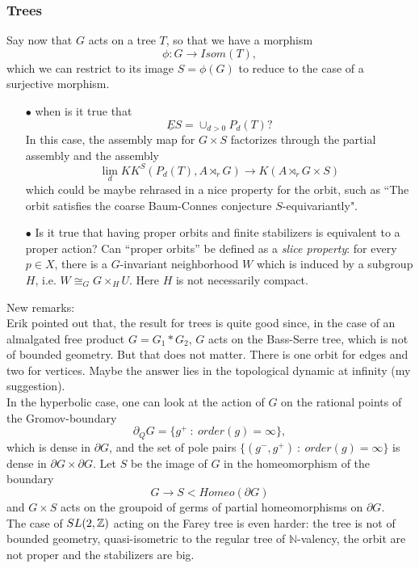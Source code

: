 \subsubsection{Trees}

Say now that $G$ acts on a tree $T$, so that we have a morphism
\[\phi: G\rightarrow Isom(T),\]
which we can restrict to its image $S= \phi(G)$ to reduce to the case of a surjective morphism. 
\begin{itemize}
\item[$\bullet$] when is it true that 
	\[\underline E S = \cup_{d>0}P_d(T)?\]
In this case, the assembly map for $G\times S$ factorizes through the partial assembly and the assembly
\[ \lim_d KK^S(P_d(T), A\rtimes_r G) \rightarrow K(A\rtimes_r G\times S)\]
which could be maybe rehrased in a nice property for the orbit, such as ``The orbit satisfies the coarse Baum-Connes conjecture $S$-equivariantly".   
\item[$\bullet$] Is it true that having proper orbits and finite stabilizers is equivalent to a proper action? Can ``proper orbits'' be defined as a \textit{slice property}: for every $p\in X$, there is a $G$-invariant neighborhood $W$ which is induced by a subgroup $H$, i.e. $W\cong_G G\times_H U$. Here $H$ is not necessarily compact. 
\end{itemize}

New remarks:\\
Erik pointed out that, the result for trees is quite good since, in the case of an almalgated free product $G=G_1 \ast G_2$, $G$ acts on the Bass-Serre tree, which is not of bounded geometry. But that does not matter. There is one orbit for edges and two for vertices. Maybe the answer lies in the topological dynamic at infinity (my suggestion).\\
In the hyperbolic case, one can look at the action of $G$ on the rational points of the Gromov-boundary
\[\partial_Q G = \{g^+ \ : \ order(g)=\infty\},\]
which is dense in $\partial G$, and the set of pole pairs $\{(g^-,g^+) \ : \ order(g)=\infty\}$ is dense in $\partial G\times \partial G$. Let $S$ be the image of $G$ in the homeomorphism of the boundary
\[ G \rightarrow S < Homeo(\partial G)\]
and $G\times S $ acts on the groupoid of germs of partial homeomorphisms on $\partial G$.\\

The case of $SL(2,\mathbb Z)$ acting on the Farey tree is even harder: the tree is not of bounded geometry, quasi-isometric to the regular tree of $\mathbb N$-valency, the orbit are not proper and the stabilizers are big.\\

